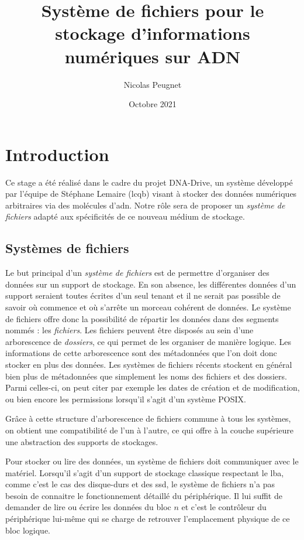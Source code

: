 \documentclass[a4paper]{report}
\title{Système de fichiers pour le stockage d’informations numériques sur ADN}
\date{Octobre 2021}
\author{Nicolas Peugnet}
\begin{document}
\begin{titlepage}
\maketitle
\end{titlepage}

\tableofcontents

\chapter{Introduction}

Ce stage a été réalisé dans le cadre du projet DNA-Drive, un système développé par l'équipe de Stéphane Lemaire (\ac{lcqb}) visant à stocker des données numériques arbitraires via des molécules d'\ac{adn}.
Notre rôle sera de proposer un \emph{système de fichiers} adapté aux spécificités de ce nouveau médium de stockage.

\section{Systèmes de fichiers}

Le but principal d'un \emph{système de fichiers} est de permettre d'organiser des données sur un support de stockage.
En son absence, les différentes données d'un support seraient toutes écrites d'un seul tenant
et il ne serait pas possible de savoir où commence et où s'arrête un morceau cohérent de données.
Le système de fichiers offre donc la possibilité de répartir les données dans des segments nommés : les \emph{fichiers}.
Les fichiers peuvent être disposés au sein d'une arborescence de \emph{dossiers},
ce qui permet de les organiser de manière logique.
Les informations de cette arborescence sont des métadonnées que l'on doit donc stocker en plus des données.
Les systèmes de fichiers récents stockent en général bien plus de métadonnées que simplement les noms des fichiers et des dossiers.
Parmi celles-ci, on peut citer par exemple les dates de création et de modification,
ou bien encore les permissions lorsqu'il s'agit d'un système POSIX.

Grâce à cette structure d'arborescence de fichiers commune à tous les systèmes,
on obtient une compatibilité de l'un à l'autre,
ce qui offre à la couche supérieure une abstraction des supports de stockages.

Pour stocker ou lire des données, un système de fichiers doit communiquer avec le matériel.
Lorsqu'il s'agit d'un support de stockage classique respectant le \ac{lba},
comme c'est le cas des disque-durs et des \ac{ssd},
le système de fichiers n'a pas besoin de connaitre le fonctionnement détaillé du périphérique.
Il lui suffit de demander de lire ou écrire les données du bloc $n$
et c'est le contrôleur du périphérique lui-même qui se charge de retrouver l'emplacement physique de ce bloc logique.
\end{document}
